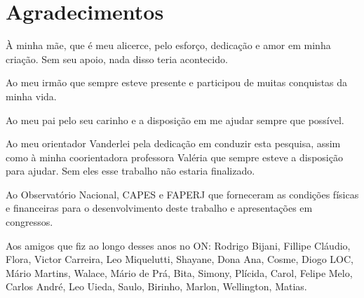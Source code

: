 \chapter*{Agradecimentos}

À minha mãe, que é meu alicerce, pelo esforço, dedicação e amor em minha criação. Sem seu apoio, nada disso teria acontecido.

Ao meu irmão que sempre esteve presente e participou de muitas conquistas da minha vida.

Ao meu pai pelo seu carinho e a disposição em me ajudar sempre que possível.

Ao meu orientador Vanderlei pela dedicação em conduzir esta pesquisa, assim como à minha coorientadora professora Valéria que sempre esteve a disposição para ajudar. Sem eles esse trabalho não estaria finalizado.

Ao Observatório Nacional, CAPES e FAPERJ que forneceram as condições físicas e financeiras para o desenvolvimento deste trabalho e apresentações em congressos.

Aos amigos que fiz ao longo desses anos no ON: Rodrigo Bijani, Fillipe Cláudio, Flora, Victor Carreira, Leo Miquelutti, Shayane, Dona Ana, Cosme, Diogo LOC, Mário Martins, Walace, Mário de Prá, Bita, Simony, Plícida, Carol, Felipe Melo, Carlos André, Leo Uieda, Saulo, Birinho, Marlon, Wellington, Matias.

